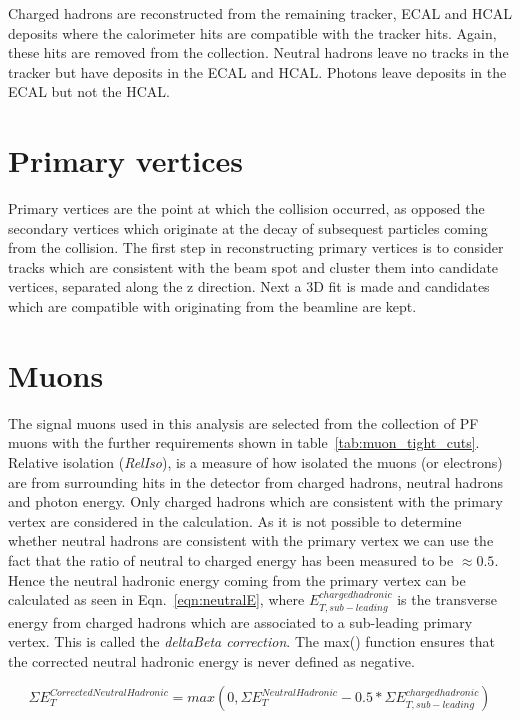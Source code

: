 Charged hadrons are reconstructed from the remaining tracker, ECAL and HCAL deposits where the calorimeter hits are compatible with the tracker hits. Again, these hits are removed from the collection. Neutral hadrons leave no tracks in the tracker but have deposits in the ECAL and HCAL. Photons leave deposits in the ECAL but not the HCAL.

\section{Primary vertices \label{sec:PVreco}}

Primary vertices are the point at which the collision occurred, as opposed the secondary vertices which originate at the decay of subsequest particles coming from the collision. The first step in reconstructing primary vertices is to consider tracks which are consistent with the beam spot and cluster them into candidate vertices, separated along the z direction. Next a 3D fit is made and candidates which are compatible with originating from the beamline are kept.

\section{Muons \label{sec:muonreco}}
The signal muons used in this analysis are selected from the collection of PF muons with the further requirements shown in table~\ref{tab:muon_tight_cuts}.
Relative isolation (\emph{RelIso}), is a measure of how isolated the muons (or electrons) are from surrounding hits in the detector from charged hadrons, neutral hadrons and photon energy. Only charged hadrons which are consistent with the primary vertex are considered in the calculation. As it is not possible to determine whether neutral hadrons are consistent with the primary vertex we can use the fact that the ratio of neutral to charged energy has been measured to be $\approx 0.5$. Hence the neutral hadronic energy coming from the primary vertex can be calculated as seen in Eqn.~\ref{eqn:neutralE}, where $E_{T,sub-leading}^{charged hadronic}$ is the transverse energy from charged hadrons which are associated to a sub-leading primary vertex. This is called the \emph{deltaBeta correction}. The max() function ensures that the corrected neutral hadronic energy is never defined as negative.

\begin{centering}
\begin{equation}
\Sigma E_{T}^{Corrected Neutral Hadronic}  =  max(0, \Sigma E_{T}^{Neutral Hadronic} - 0.5*\Sigma E_{T,sub-leading}^{charged hadronic} )
\label{eqn:neutralE}
\end{equation}
\end{centering}



